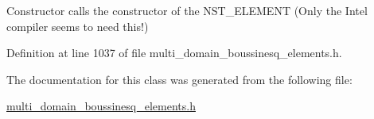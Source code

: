 Constructor calls the constructor of the N\+S\+T\+\_\+\+E\+L\+E\+M\+E\+NT (Only the Intel compiler seems to need this!) 



Definition at line 1037 of file multi\+\_\+domain\+\_\+boussinesq\+\_\+elements.\+h.



The documentation for this class was generated from the following file\+:\begin{DoxyCompactItemize}
\item 
\hyperlink{multi__domain__boussinesq__elements_8h}{multi\+\_\+domain\+\_\+boussinesq\+\_\+elements.\+h}\end{DoxyCompactItemize}
